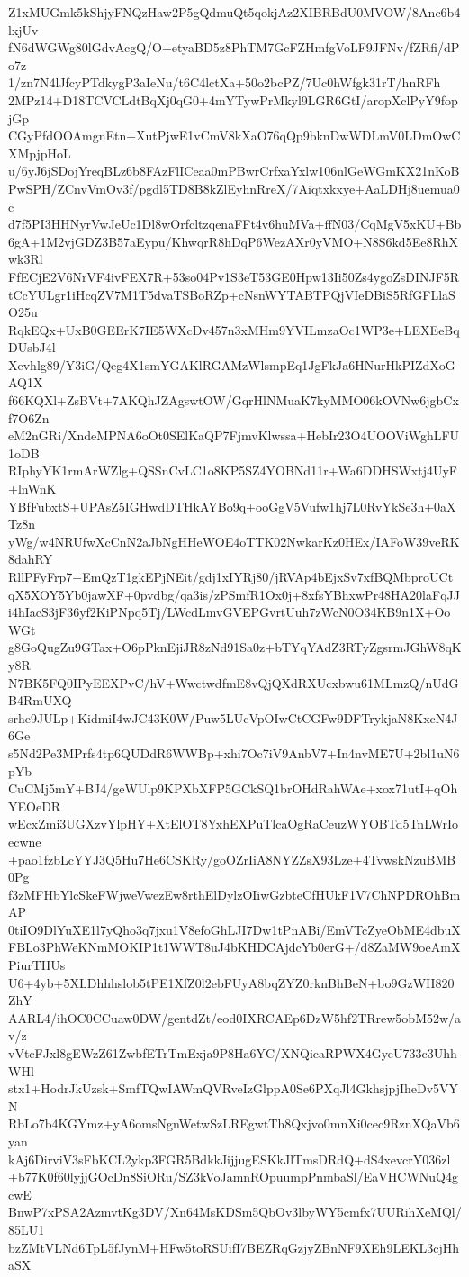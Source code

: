 Z1xMUGmk5kShjyFNQzHaw2P5gQdmuQt5qokjAz2XIBRBdU0MVOW/8Anc6b4lxjUv
fN6dWGWg80lGdvAcgQ/O+etyaBD5z8PhTM7GcFZHmfgVoLF9JFNv/fZRfi/dPo7z
1/zn7N4lJfcyPTdkygP3aIeNu/t6C4lctXa+50o2bcPZ/7Uc0hWfgk31rT/hnRFh
2MPz14+D18TCVCLdtBqXj0qG0+4mYTywPrMkyl9LGR6GtI/aropXclPyY9fopjGp
CGyPfdOOAmgnEtn+XutPjwE1vCmV8kXaO76qQp9bknDwWDLmV0LDmOwCXMpjpHoL
u/6yJ6jSDojYreqBLz6b8FAzFlICeaa0mPBwrCrfxaYxlw106nlGeWGmKX21nKoB
PwSPH/ZCnvVmOv3f/pgdl5TD8B8kZlEyhnRreX/7Aiqtxkxye+AaLDHj8uemua0c
d7f5PI3HHNyrVwJeUc1Dl8wOrfcltzqenaFFt4v6huMVa+ffN03/CqMgV5xKU+Bb
6gA+1M2vjGDZ3B57aEypu/KhwqrR8hDqP6WezAXr0yVMO+N8S6kd5Ee8RhXwk3Rl
FfECjE2V6NrVF4ivFEX7R+53so04Pv1S3eT53GE0Hpw13Ii50Zs4ygoZsDINJF5R
tCcYULgr1iHcqZV7M1T5dvaTSBoRZp+cNsnWYTABTPQjVIeDBiS5RfGFLlaSO25u
RqkEQx+UxB0GEErK7IE5WXcDv457n3xMHm9YVILmzaOc1WP3e+LEXEeBqDUsbJ4l
Xevhlg89/Y3iG/Qeg4X1smYGAKlRGAMzWlsmpEq1JgFkJa6HNurHkPIZdXoGAQ1X
f66KQXl+ZsBVt+7AKQhJZAgswtOW/GqrHlNMuaK7kyMMO06kOVNw6jgbCxf7O6Zn
eM2nGRi/XndeMPNA6oOt0SElKaQP7FjmvKlwssa+HebIr23O4UOOViWghLFU1oDB
RIphyYK1rmArWZlg+QSSnCvLC1o8KP5SZ4YOBNd11r+Wa6DDHSWxtj4UyF+lnWnK
YBfFubxtS+UPAsZ5IGHwdDTHkAYBo9q+ooGgV5Vufw1hj7L0RvYkSe3h+0aXTz8n
yWg/w4NRUfwXcCnN2aJbNgHHeWOE4oTTK02NwkarKz0HEx/IAFoW39veRK8dahRY
RllPFyFrp7+EmQzT1gkEPjNEit/gdj1xIYRj80/jRVAp4bEjxSv7xfBQMbproUCt
qX5XOY5Yb0jawXF+0pvdbg/qa3is/zPSmfR1Ox0j+8xfsYBhxwPr48HA20laFqJJ
i4hIacS3jF36yf2KiPNpq5Tj/LWcdLmvGVEPGvrtUuh7zWcN0O34KB9n1X+OoWGt
g8GoQugZu9GTax+O6pPknEjiJR8zNd91Sa0z+bTYqYAdZ3RTyZgsrmJGhW8qKy8R
N7BK5FQ0IPyEEXPvC/hV+WwctwdfmE8vQjQXdRXUcxbwu61MLmzQ/nUdGB4RmUXQ
srhe9JULp+KidmiI4wJC43K0W/Puw5LUcVpOIwCtCGFw9DFTrykjaN8KxcN4J6Ge
s5Nd2Pe3MPrfs4tp6QUDdR6WWBp+xhi7Oc7iV9AnbV7+In4nvME7U+2bl1uN6pYb
CuCMj5mY+BJ4/geWUlp9KPXbXFP5GCkSQ1brOHdRahWAe+xox71utI+qOhYEOeDR
wEcxZmi3UGXzvYlpHY+XtElOT8YxhEXPuTlcaOgRaCeuzWYOBTd5TnLWrIoecwne
+pao1fzbLcYYJ3Q5Hu7He6CSKRy/goOZrIiA8NYZZsX93Lze+4TvwskNzuBMB0Pg
f3zMFHbYlcSkeFWjweVwezEw8rthElDylzOIiwGzbteCfHUkF1V7ChNPDROhBmAP
0tiIO9DlYuXE1l7yQho3q7jxu1V8efoGhLJI7Dw1tPnABi/EmVTcZyeObME4dbuX
FBLo3PhWeKNmMOKIP1t1WWT8uJ4bKHDCAjdcYb0erG+/d8ZaMW9oeAmXPiurTHUs
U6+4yb+5XLDhhhslob5tPE1XfZ0l2ebFUyA8bqZYZ0rknBhBeN+bo9GzWH820ZhY
AARL4/ihOC0CCuaw0DW/gentdZt/eod0IXRCAEp6DzW5hf2TRrew5obM52w/av/z
vVtcFJxl8gEWzZ61ZwbfETrTmExja9P8Ha6YC/XNQicaRPWX4GyeU733c3UhhWHl
stx1+HodrJkUzsk+SmfTQwIAWmQVRveIzGlppA0Se6PXqJl4GkhsjpjIheDv5VYN
RbLo7b4KGYmz+yA6omsNgnWetwSzLREgwtTh8Qxjvo0mnXi0cec9RznXQaVb6yan
kAj6DirviV3sFbKCL2ykp3FGR5BdkkJijjugESKkJlTmsDRdQ+dS4xevcrY036zl
+b77K0f60lyjjGOcDn8SiORu/SZ3kVoJamnROpuumpPnmbaSl/EaVHCWNuQ4gcwE
BnwP7xPSA2AzmvtKg3DV/Xn64MsKDSm5QbOv3lbyWY5cmfx7UURihXeMQl/85LU1
bzZMtVLNd6TpL5fJynM+HFw5toRSUifI7BEZRqGzjyZBnNF9XEh9LEKL3cjHhaSX
